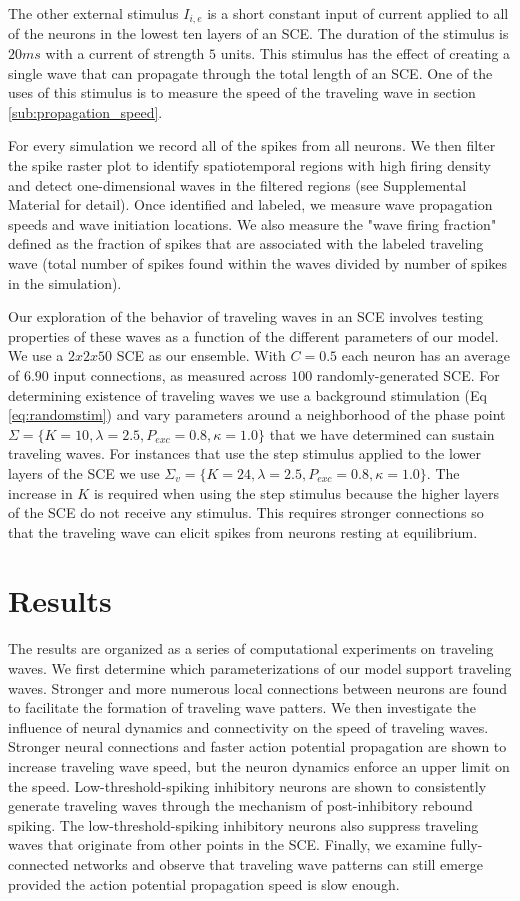 \documentclass[12pt]{article}
\begin{document}
The other external stimulus $I_{i,e}$ is a short constant input of current applied to all of the neurons in the lowest ten layers of an SCE. 
The duration of the stimulus is $20 ms$ with a current of strength $5$ units. 
This stimulus has the effect of creating a single wave that can propagate through the total length of an SCE.
One of the uses of this stimulus is to measure the speed of the traveling wave in section \ref{sub:propagation_speed}.

For every simulation we record all of the spikes from all neurons. 
We then filter the spike raster plot to identify spatiotemporal regions with high firing density and detect one-dimensional waves in the filtered regions (see Supplemental Material for detail). 
Once identified and labeled, we measure wave propagation speeds and wave initiation locations. 
We also measure the "wave firing fraction" defined as the fraction of spikes that are associated with the labeled traveling wave (total number of spikes found within the waves divided by number of spikes in the simulation). 

Our exploration of the behavior of traveling waves in an SCE involves testing properties of these waves as a function of the different parameters of our model.
We use a $2x2x50$ SCE as our ensemble.
With $C=0.5$ each neuron has an average of $6.90$ input connections, as measured across $100$ randomly-generated SCE. 
For determining existence of traveling waves we use a background stimulation (Eq \ref{eq:randomstim}) and vary parameters around a neighborhood of the phase point $\Sigma = \{K=10,\lambda=2.5,P_{exc}=0.8,\kappa=1.0 \}$ that we have determined can sustain traveling waves.
For instances that use the step stimulus applied to the lower layers of the SCE we use $\Sigma_v = \{K=24,\lambda=2.5,P_{exc}=0.8,\kappa=1.0 \}$.
The increase in $K$ is required when using the step stimulus because the higher layers of the SCE do not receive any stimulus.
This requires stronger connections so that the traveling wave can elicit spikes from neurons resting at equilibrium.
\FloatBarrier

\section{Results}
The results are organized as a series of computational experiments on traveling waves.
We first determine which parameterizations of our model support traveling waves.
Stronger and more numerous local connections between neurons are found to facilitate the formation of traveling wave patters.
We then investigate the influence of neural dynamics and connectivity on the speed of traveling waves.
Stronger neural connections and faster action potential propagation are shown to increase traveling wave speed, but the neuron dynamics enforce an upper limit on the speed. 
Low-threshold-spiking inhibitory neurons are shown to consistently generate traveling waves through the mechanism of post-inhibitory rebound spiking.
The low-threshold-spiking inhibitory neurons also suppress traveling waves that originate from other points in the SCE.
Finally, we examine fully-connected networks and observe that traveling wave patterns can still emerge provided the action potential propagation speed is slow enough.
\end{document}
